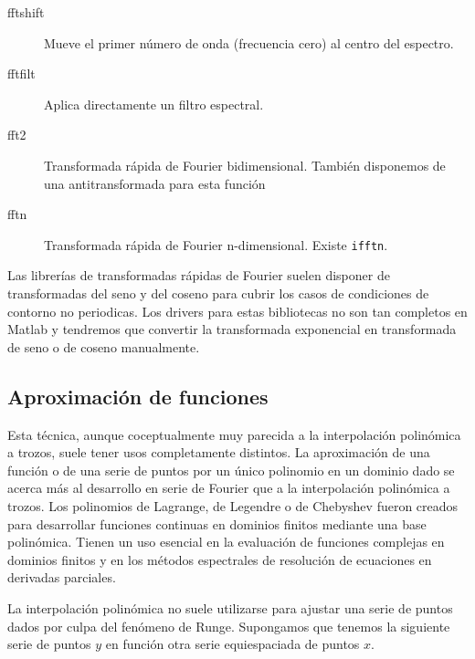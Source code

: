 \begin{description}
\item [fftshift]Mueve el primer número de onda
  (frecuencia cero) al centro del espectro.
\item [fftfilt]Aplica directamente un filtro espectral.
\item [fft2]Transformada rápida de Fourier bidimensional.
  También disponemos de una antitransformada para esta función
\item [fftn]Transformada rápida de Fourier n-dimensional.
  Existe \texttt{ifftn}.
\end{description}
Las librerías de transformadas rápidas de Fourier suelen disponer de
transformadas del seno y del coseno para cubrir los casos de
condiciones de contorno no periodicas. Los drivers para estas
bibliotecas no son tan completos en Matlab y tendremos que convertir
la transformada exponencial en transformada de seno o de coseno
manualmente.


\subsection{Aproximación de
  funciones\label{sub:Aproximación-de-funciones}}

Esta técnica, aunque coceptualmente muy parecida a la interpolación
polinómica a trozos, suele tener usos completamente distintos. La
aproximación de una función o de una serie de puntos por un único
polinomio en un dominio dado se acerca más al desarrollo en serie de
Fourier que a la interpolación polinómica a trozos. Los polinomios de
Lagrange, de Legendre o de Chebyshev fueron creados para desarrollar
funciones continuas en dominios finitos mediante una base polinómica.
Tienen un uso esencial en la evaluación de funciones complejas en
dominios finitos y en los métodos espectrales de resolución de
ecuaciones en derivadas parciales.

La interpolación polinómica no suele utilizarse para ajustar una serie
de puntos dados por culpa del fenómeno de Runge. Supongamos que
tenemos la siguiente serie de puntos $y$ en función otra serie
equiespaciada de puntos $x$.

